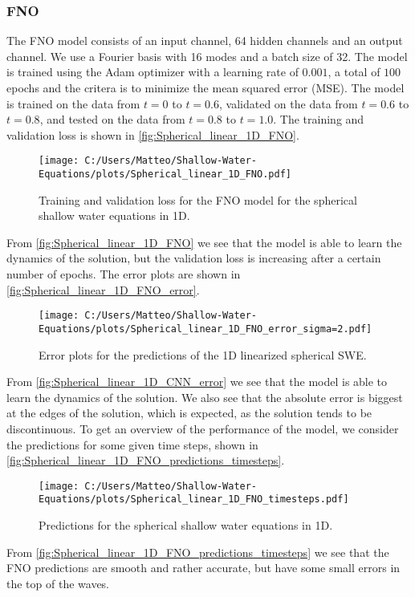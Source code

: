 \subsubsection{FNO}
The FNO model consists of an input channel, 64 hidden channels and an output channel. We use a Fourier basis with 16 modes and a batch size of 32.
The model is trained using the Adam optimizer with a learning rate of $0.001$, a total of $100$ epochs and the critera is to minimize the mean squared error (MSE).
The model is trained on the data from $t = 0$ to $t = 0.6$, validated on the data from $t = 0.6$ to $t = 0.8$, and tested on the data from $t = 0.8$ to $t = 1.0$.
The training and validation loss is shown in \autoref{fig:Spherical_linear_1D_FNO}.
\begin{figure}[H]
    \centering
    \texttt{[image: C:/Users/Matteo/Shallow-Water-Equations/plots/Spherical\_linear\_1D\_FNO.pdf]}
    \caption{Training and validation loss for the FNO model for the spherical shallow water equations in 1D.}\label{fig:Spherical_linear_1D_FNO}
\end{figure}
From \autoref{fig:Spherical_linear_1D_FNO} we see that the model is able to learn the dynamics of the solution, but the validation loss is increasing after a certain number of epochs.
The error plots are shown in \autoref{fig:Spherical_linear_1D_FNO_error}.
\begin{figure}[H]
    \centering
    \texttt{[image: C:/Users/Matteo/Shallow-Water-Equations/plots/Spherical\_linear\_1D\_FNO\_error\_sigma=2.pdf]}
    \caption{Error plots for the predictions of the 1D linearized spherical SWE.}\label{fig:Spherical_linear_1D_FNO_error}
\end{figure}
From \autoref{fig:Spherical_linear_1D_CNN_error} we see that the model is able to learn the dynamics of the solution.
We also see that the absolute error is biggest at the edges of the solution, which is expected, as the solution tends to be discontinuous.
To get an overview of the performance of the model, we consider the predictions for some given time steps, shown in \autoref{fig:Spherical_linear_1D_FNO_predictions_timesteps}.
\begin{figure}[H]
    \centering
    \texttt{[image: C:/Users/Matteo/Shallow-Water-Equations/plots/Spherical\_linear\_1D\_FNO\_timesteps.pdf]}
    \caption{Predictions for the spherical shallow water equations in 1D.}\label{fig:Spherical_linear_1D_FNO_predictions_timesteps}
\end{figure}
From \autoref{fig:Spherical_linear_1D_FNO_predictions_timesteps} we see that the FNO predictions are smooth and rather accurate, but have some small errors in the top of the waves.
